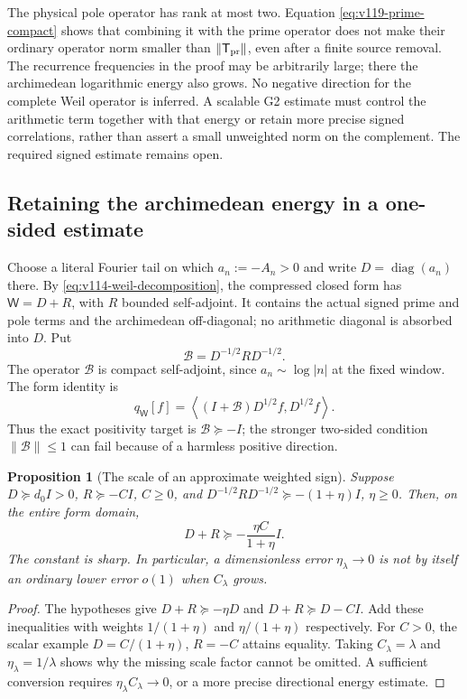 \documentclass[11pt]{article}
\newtheorem{proposition}[theorem]{Proposition}
\theoremstyle{remark}
\newcommand{\ip}[2]{\left\langle #1,#2\right\rangle}
\begin{document}
The physical pole operator has rank at most two.  Equation
\eqref{eq:v119-prime-compact} shows that combining it with the prime
operator does not make their ordinary operator norm smaller than
$\|\mathsf T_{\rm pr}\|$, even after a finite source removal.
The recurrence frequencies in the proof may be arbitrarily large;
there the archimedean logarithmic energy also grows.  No negative
direction for the complete Weil operator is inferred.  A scalable G2
estimate must control the arithmetic term together with that energy
or retain more precise signed correlations, rather than assert a small
unweighted norm on the complement.  The required signed estimate
remains open.

\subsection*{Retaining the archimedean energy in a one-sided estimate}

Choose a literal Fourier tail on which $a_n:=-A_n>0$ and write
$D=\operatorname{diag}(a_n)$ there. By
\eqref{eq:v114-weil-decomposition}, the compressed closed form has
$\mathsf W=D+R$, with $R$ bounded self-adjoint. It contains the
actual signed prime and pole terms and the archimedean off-diagonal;
no arithmetic diagonal is absorbed into $D$. Put
\begin{equation}\label{eq:v120-weighted-remainder}
 \mathcal B=D^{-1/2}R D^{-1/2}.
\end{equation}
The operator $\mathcal B$ is compact self-adjoint, since
$a_n\sim\log|n|$ at the fixed window. The form identity is
\[
 q_{\mathsf W}[f]
 =\ip{(I+\mathcal B)D^{1/2}f}{D^{1/2}f}.
\]
Thus the exact positivity target is $\mathcal B\succeq-I$;
the stronger two-sided condition $\|\mathcal B\|\le1$ can fail
because of a harmless positive direction.

\begin{proposition}[The scale of an approximate weighted sign]
\label{prop:v120-weighted-error}
Suppose $D\succeq d_0I>0$, $R\succeq-CI$, $C\ge0$, and
$D^{-1/2}RD^{-1/2}\succeq-(1+\eta)I$, $\eta\ge0$.
Then, on the entire form domain,
\begin{equation}\label{eq:v120-weighted-error}
 D+R\succeq-\frac{\eta C}{1+\eta}I.
\end{equation}
The constant is sharp. In particular, a dimensionless error
$\eta_\lambda\to0$ is not by itself an ordinary lower error
$o(1)$ when $C_\lambda$ grows.
\end{proposition}
\begin{proof}
The hypotheses give $D+R\succeq-\eta D$ and
$D+R\succeq D-CI$. Add these inequalities with weights
$1/(1+\eta)$ and $\eta/(1+\eta)$ respectively. For $C>0$,
the scalar example $D=C/(1+\eta)$, $R=-C$ attains equality.
Taking $C_\lambda=\lambda$ and $\eta_\lambda=1/\lambda$
shows why the missing scale factor cannot be omitted. A sufficient
conversion requires $\eta_\lambda C_\lambda\to0$, or a more
precise directional energy estimate.
\end{proof}
\end{document}
